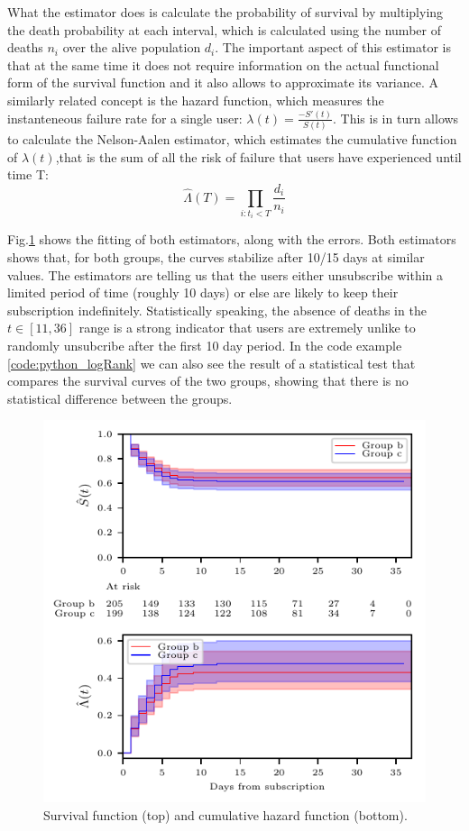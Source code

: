 \documentclass[paper=a4, fontsize=10pt]{report}
\begin{document}
What the estimator does is calculate the probability of survival by multiplying the death probability at each interval, which
is calculated using the number of deaths $n_{i}$ over the alive population $d_{i}$. The important aspect of this 
estimator is that at the same time it does not require information on the actual functional form of the survival function
and it also allows to approximate its variance. A similarly related concept is the hazard function, which measures
the instanteneous failure rate for a single user: $ \lambda (t) = \frac{-S'(t)}{S(t)}
$. This is in turn allows to calculate the Nelson-Aalen estimator, which estimates the cumulative function of $\lambda(t)$,that
is the sum of all the risk of failure that users have experienced until time T:
\begin{equation}
 \hat{\Lambda}(T) = \prod_{i: t_{i} < T}  \frac{d_{i}}{n_{i}}
\end{equation}


Fig.\ref{fig:survival} shows the fitting of both estimators, along with the errors. Both estimators shows that, for both groups,
the curves stabilize after 10/15 days at similar values. The estimators are telling us that the users
either unsubscribe within a limited period of time (roughly 10 days) or else are likely to keep their subscription indefinitely. Statistically
speaking, the absence of deaths in the $t \in [11,36]$ range is a strong indicator that users are extremely unlike to randomly
unsubcribe after the first 10 day period. In the code example \ref{code:python_logRank} we can also see the result of a statistical test
that compares the survival curves of the two groups, showing that there is no statistical difference between the groups.

\begin{figure}[htpb!]
\centering
\includegraphics[scale = 0.8]{survival.pdf}
\caption{Survival function (top) and cumulative hazard function (bottom).}
\label{fig:survival}
\end{figure}
\end{document}
